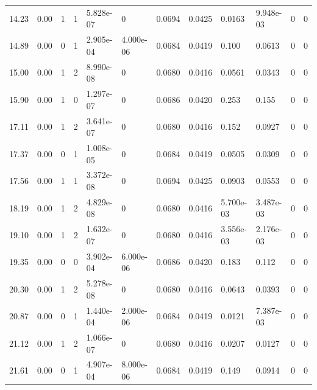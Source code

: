 \documentclass[preview]{standalone}
\begin{document}
{{\begin{tabular}{L{1.2cm}C{1.2cm} C{0.3cm}C{0.5cm} C{1.4cm}C{1.4cm} C{1.4cm}C{1.4cm} C{1.6cm}C{1.6cm} C{1.6cm}C{1.6cm}}
  14.23  &  0.00  & 1     &  1 &  5.828e-07  & 0  &  0.0694&   0.0425& 0.0163 & 9.948e-03   &  0 & 0  \\ 
  14.89  &  0.00  & 0     &  1 &  2.905e-04  & 4.000e-06  &  0.0684&   0.0419& 0.100 & 0.0613   &  0 & 0  \\ 
  15.00  &  0.00  & 1     &  2 &  8.990e-08  & 0  &  0.0680&   0.0416& 0.0561 & 0.0343   &  0 & 0  \\ 
  15.90  &  0.00  & 1     &  0 &  1.297e-07  & 0  &  0.0686&   0.0420& 0.253 & 0.155   &  0 & 0  \\ 
  17.11  &  0.00  & 1     &  2 &  3.641e-07  & 0  &  0.0680&   0.0416& 0.152 & 0.0927   &  0 & 0  \\ 
  17.37  &  0.00  & 0     &  1 &  1.008e-05  & 0  &  0.0684&   0.0419& 0.0505 & 0.0309   &  0 & 0  \\ 
  17.56  &  0.00  & 1     &  1 &  3.372e-08  & 0  &  0.0694&   0.0425& 0.0903 & 0.0553   &  0 & 0  \\ 
  18.19  &  0.00  & 1     &  2 &  4.829e-08  & 0  &  0.0680&   0.0416& 5.700e-03 & 3.487e-03   &  0 & 0  \\ 
  19.10  &  0.00  & 1     &  2 &  1.632e-07  & 0  &  0.0680&   0.0416& 3.556e-03 & 2.176e-03   &  0 & 0  \\ 
  19.35  &  0.00  & 0     &  0 &  3.902e-04  & 6.000e-06  &  0.0686&   0.0420& 0.183 & 0.112   &  0 & 0  \\ 
  20.30  &  0.00  & 1     &  2 &  5.278e-08  & 0  &  0.0680&   0.0416& 0.0643 & 0.0393   &  0 & 0  \\ 
  20.87  &  0.00  & 0     &  1 &  1.440e-04  & 2.000e-06  &  0.0684&   0.0419& 0.0121 & 7.387e-03   &  0 & 0  \\ 
  21.12  &  0.00  & 1     &  2 &  1.066e-07  & 0  &  0.0680&   0.0416& 0.0207 & 0.0127   &  0 & 0  \\ 
  21.61  &  0.00  & 0     &  1 &  4.907e-04  & 8.000e-06  &  0.0684&   0.0419& 0.149 & 0.0914   &  0 & 0  \\ 
\hline 
\end{tabular} 

}}
\end{document}
